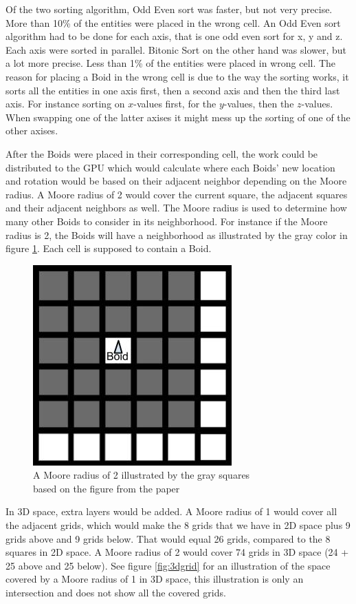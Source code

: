 Of the two sorting algorithm, Odd Even sort was faster, but not very precise. More than 10\% of the entities were placed in the wrong cell. An Odd Even sort algorithm had to be done for each axis, that is one odd even sort for x, y and z. Each axis were sorted in parallel.
Bitonic Sort on the other hand was slower, but a lot more precise. Less than 1\% of the entities were placed in wrong cell. The reason for placing a Boid in the wrong cell is due to the way the sorting works, it sorts all the entities in one axis first, then a second axis and then the third last axis. For instance sorting on $x$-values first, for the $y$-values, then the $z$-values. When swapping one of the latter axises it might mess up the sorting of one of the other axises.

After the Boids were placed in their corresponding cell, the work could be distributed to the GPU which would calculate where each Boids' new location and rotation would be based on their adjacent neighbor depending on the Moore radius. A Moore radius of 2 would cover the current square, the adjacent squares and their adjacent neighbors as well. The Moore radius is used to determine how many other Boids to consider in its neighborhood. For instance if the Moore radius is 2, the Boids will have a neighborhood as illustrated by the gray color in figure \ref{fig:moore}. Each cell is supposed to contain a Boid.
\begin{figure}[H]
    \centering
    \includegraphics[width=0.3\linewidth]{images/moore}
    \caption[Moore radius illustrated, 2D]{A Moore radius of 2 illustrated by the gray squares \\ based on the figure from the paper \citep{Joselli2009}}\label{fig:moore}
\end{figure}
In 3D space, extra layers would be added. A Moore radius of 1 would cover all the adjacent grids, which would make the 8 grids that we have in 2D space plus 9 grids above and 9 grids below. That would equal 26 grids, compared to the 8 squares in 2D space. A Moore radius of 2 would cover 74 grids in 3D space (24 + 25 above and 25 below). See figure \ref{fig:3dgrid} for an illustration of the space covered by a Moore radius of 1 in 3D space, this illustration is only an intersection and does not show all the covered grids.
